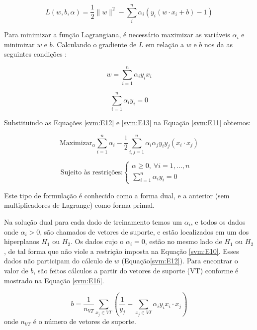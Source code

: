 \begin{equation} \label{svm:E11}
L(w,b,\alpha) = \frac{1}{2}\parallel w \parallel^2 - \sum_{i}^{n} \alpha_{i}(y_{i}(w \cdot x_{i} + b) - 1)
\end{equation}

Para minimizar a função Lagrangiana, é necessário maximizar as variáveis $\alpha_{i}$ e minimizar $w$ e $b$. Calculando o gradiente de $L$ em relação a $w$ e $b$ nos da as seguintes condições \cite{Burges1998Support}:

\begin{equation}\label{svm:E12}
w = \sum_{i = 1}^{n} \alpha_{i}y_{i}x_{i}
\end{equation}

\begin{equation}\label{svm:E13}
\sum_{i = 1}^{n} \alpha_{i}y_{i} = 0
\end{equation}

Substituindo as Equações \ref{svm:E12} e \ref{svm:E13} na Equação \ref{svm:E11} obtemos:

\begin{equation}\label{svm:E14}
\text{Maximizar}_{\alpha} \sum_{i = 1}^{n} \alpha_{i} - \frac{1}{2} \sum_{i,j = 1}^{n} \alpha_{i}\alpha_{j}y_{i}y_{j}(x_{i} \cdot x_{j})
\end{equation}

\begin{equation} \label{svm:E15}
\text{Sujeito às restrições:} 
\left\{\begin{matrix}
\alpha \geq 0, \  \forall i = 1,...,n \\ 
\sum_{i = 1}^{n} \alpha_{i}y_{i} = 0  &
\end{matrix}\right.
\end{equation}

Este tipo de formulação é conhecido como a forma dual, e a anterior (sem multiplicadores de Lagrange) como forma primal. 

Na solução dual para cada dado de treinamento temos um $\alpha_{i}$, e todos os dados onde $\alpha_{i} > 0$, são chamados de vetores de suporte, e estão localizados em um dos hiperplanos $H_{1}$ ou $H_{2}$. Os dados cujo o $\alpha_{i} = 0$, estão no mesmo lado de $H_{1}$ ou $H_{2}$, de tal forma que não viole a restrição imposta na Equação \ref{svm:E10}. Esses dados não participam do cálculo de $w$ (Equação\ref{svm:E12}). Para encontrar o valor de $b$, são feitos cálculos a partir do vetores de suporte (VT) conforme é mostrado na Equação \ref{svm:E16}.

\begin{equation} \label{svm:E16}
b = \frac{1}{n_{VT}} \sum_{x_{j} \in VT} \left(\frac{1}{y_{j}} - \sum_{x_{j} \in VT} \alpha_{i}y_{i}x_{i} \cdot x_{j} \right)
\end{equation}
onde $n_{VT}$ é o número de vetores de suporte.


